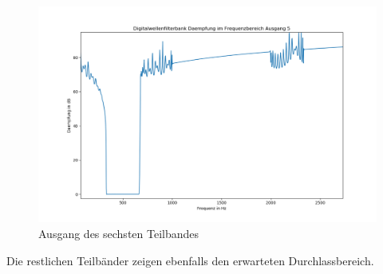 \begin{figure}[h!]
	\centering	\includegraphics[width=14cm]{img/bank_freq_5_close.png}
	\caption{Ausgang des sechsten Teilbandes}
	\label{fig:Teilband5}
\end{figure}
Die restlichen Teilbänder zeigen ebenfalls den erwarteten Durchlassbereich.

